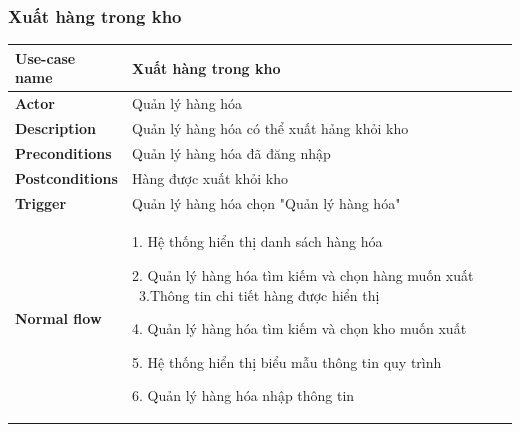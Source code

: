         \subsubsection{Xuất hàng trong kho}
            \begin{longtable}{| p{} | p{} |} 
                \hline
                    \textbf{Use-case name} 
                & 
                    Xuất hàng trong kho
                \\
                \hline
                    \textbf{Actor} 
                & 
                    Quản lý hàng hóa
                \\
                \hline
                    \textbf{Description} 
                & 
                    Quản lý hàng hóa có thể xuất hảng khỏi kho
                \\
                \hline
                    \textbf{Preconditions} 
                &
                    Quản lý hàng hóa đã đăng nhập
                \\
                \hline
                    \textbf{Postconditions} 
                & 
                    Hàng được xuất khỏi kho
                \\
                \hline
                    \textbf{Trigger} 
                & 
                    Quản lý hàng hóa chọn "Quản lý hàng hóa"
                \\
                \hline
                \begin{flushleft}
                    \textbf{Normal flow}
                \end{flushleft}
                & 
                1. Hệ thống hiển thị danh sách hàng hóa
                    
                    2. Quản lý hàng hóa tìm kiếm và chọn hàng muốn xuất
                    \
                    3.Thông tin chi tiết hàng được hiển thị
                    
                    4. Quản lý hàng hóa tìm kiếm và chọn kho muốn xuất
                    
                    5. Hệ thống hiển thị biểu mẫu thông tin quy trình
                    
                    6. Quản lý hàng hóa nhập thông tin
                    

\end{longtable}
